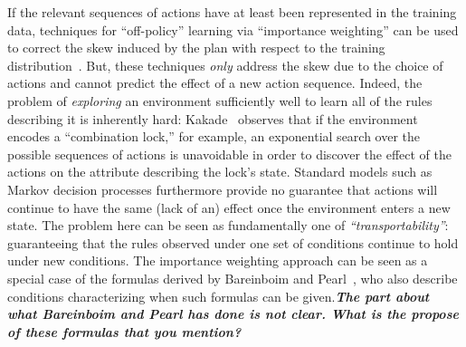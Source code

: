 \documentclass[12pt]{article}
\newcommand{\note}[1]{\textbf{\textit{#1}}}
\begin{document}
If the relevant sequences of actions have at least been represented in the training data, techniques for ``off-policy'' learning via ``importance weighting'' can be used to correct the skew induced by the plan with respect to the training distribution~\cite{precup2000off-policy,precup2001off-policy,shelton2001,peshkin2001,peshkin2002,uchibe2004,wawrzynski2009,hachiya2009,hachiya2011,juba2016jmlr}. But, these techniques {\em only} address the skew due to the choice of actions and cannot predict the effect of a new action sequence. Indeed, the problem of {\em exploring} an environment sufficiently well to learn all of the rules describing it is inherently hard: Kakade~\cite[Section~8.6]{kakade2003thesis} observes that if the environment encodes a ``combination lock,'' for example, an exponential search over the possible sequences of actions is unavoidable in order to discover the effect of the actions on the attribute describing the lock's state. Standard models such as Markov decision processes furthermore provide no guarantee that actions will continue to have the same (lack of an) effect once the environment enters a new state. The problem here can be seen as fundamentally one of {\em ``transportability''}: guaranteeing that the rules observed under one set of conditions continue to hold under new conditions. The importance weighting approach can be seen as a special case of the formulas derived by Bareinboim and Pearl~\cite{bareinboim2012completeness,bareinboim2013algorithm}, who also describe conditions characterizing when such formulas can be given.\note{The part about what Bareinboim and Pearl has done is not clear. What is the propose of these formulas that you mention?}
\end{document}
